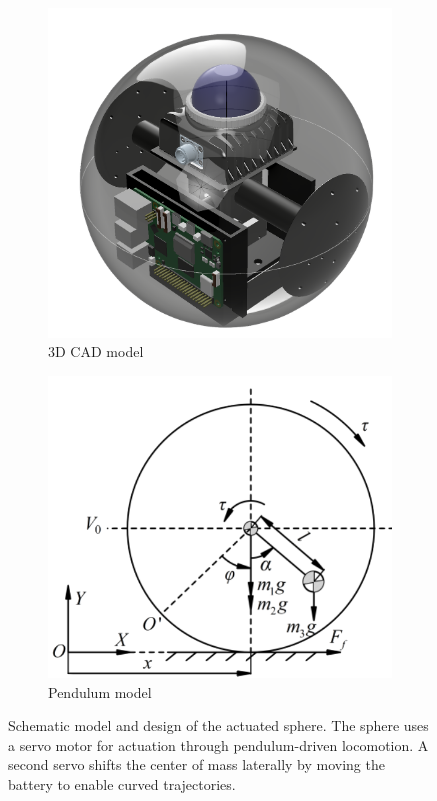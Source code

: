 \documentclass[a4paper, conference]{IEEEtran}
\begin{document}
\begin{figure}
\begin{subfigure}{0.47\columnwidth}
    \centering
    \includegraphics[width=\textwidth]{pics/Actuated_sphere.png}
    \caption{3D CAD model}
    \label{fig:cad-design2}
\end{subfigure}
\hfill
\begin{subfigure}{0.52\columnwidth}
    \centering
    \includegraphics[width=\textwidth]{pics/planer_model.png}
    \caption{Pendulum model~\cite{Sphere_2D}}
    \label{fig:2d-model2}
\end{subfigure}
\caption{Schematic model and design of the actuated sphere.
The sphere uses a servo motor for actuation through pendulum-driven locomotion.
A second servo shifts the center of mass laterally by moving the battery to enable curved trajectories.}
\label{fig:cad-design2}
\end{figure}
\end{document}
